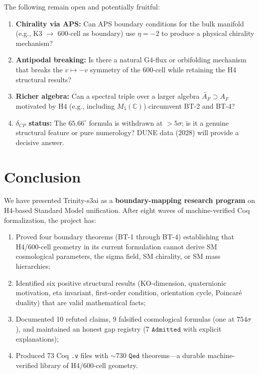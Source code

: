 \documentclass[12pt,a4paper]{article}
\newcommand{\AF}{A_F}
\newcommand{\Qed}{\texttt{Qed}}
\newcommand{\Admitted}{\texttt{Admitted}}
\begin{document}
The following remain open and potentially fruitful:
\begin{enumerate}
  \item \textbf{Chirality via APS:} Can APS boundary conditions for the bulk manifold
    (e.g., K3 \(\to\) 600-cell as boundary) use \(\eta = -2\) to produce a physical
    chirality mechanism?
  \item \textbf{Antipodal breaking:} Is there a natural G4-flux or orbifolding mechanism
    that breaks the \(v \mapsto -v\) symmetry of the 600-cell while retaining the
    H4 structural results?
  \item \textbf{Richer algebra:} Can a spectral triple over a larger algebra
    \(\tilde{\AF} \supset \AF\) motivated by H4 (e.g., including \(M_5(\mathbb{C})\))
    circumvent BT-2 and BT-4?
  \item \textbf{\(\delta_{CP}\) status:} The \(65.66^\circ\) formula is withdrawn at ${>}5\sigma$; is it a genuine
    structural feature or pure numerology? DUNE data (2028) will provide a decisive answer.
\end{enumerate}


\section{Conclusion}
\label{sec:conclusion}

We have presented Trinity-s3ai as a \textbf{boundary-mapping research program} on H4-based
Standard Model unification. After eight waves of machine-verified Coq formalization,
the project has:

\begin{enumerate}
  \item Proved four boundary theorems (BT-1 through BT-4) establishing that H4/600-cell
    geometry in its current formulation cannot derive SM cosmological parameters, the
    sigma field, SM chirality, or SM mass hierarchies;
  \item Identified six positive structural results (KO-dimension, quaternionic motivation,
    eta invariant, first-order condition, orientation cycle, Poincar\'e duality) that
    are valid mathematical facts;
  \item Documented 10 refuted claims, 9 falsified cosmological formulas (one at \(754\sigma\)),
    and maintained an honest gap registry (7 \(\Admitted\) with explicit explanations);
  \item Produced 73 Coq \texttt{.v} files with \(\sim\)730 \(\Qed\) theorems---a
    durable machine-verified library of H4/600-cell geometry.
\end{enumerate}
\end{document}
